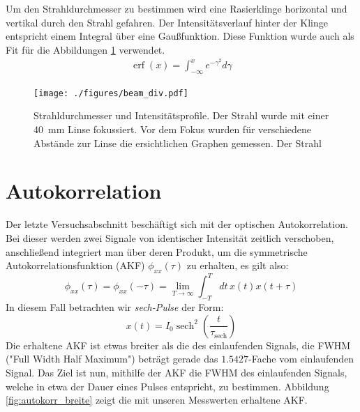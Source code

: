 \documentclass[11pt,twoside=semi]{scrartcl}
\begin{document}
Um den Strahldurchmesser zu bestimmen wird eine Rasierklinge horizontal und
vertikal durch den Strahl gefahren. Der Intensitätsverlauf hinter der Klinge
entspricht einem Integral über eine Gaußfunktion. Diese Funktion wurde auch
als Fit für die Abbildungen \ref{fig:beam_div} verwendet.
%
\begin{align*}
  \operatorname{erf}(x) = \int_{-\infty}^{x} e^{-\gamma^2} d\gamma
\end{align*}
%


\begin{figure}[H]
  \centering
  \texttt{[image: ./figures/beam\_div.pdf]}
  \caption{Strahldurchmesser und Intensitätsprofile. Der Strahl wurde mit einer
  \SI{40}{\milli\metre} Linse fokussiert. Vor dem Fokus wurden für verschiedene 
  Abstände zur Linse die ersichtlichen Graphen gemessen. Der Strahl}
  \label{fig:beam_div}
\end{figure}




\newpage



\section{Autokorrelation}
Der letzte Versuchsabschnitt beschäftigt sich mit der optischen Autokorrelation. Bei dieser
werden zwei Signale von identischer Intensität zeitlich verschoben, anschließend integriert
man über deren Produkt, um die symmetrische Autokorrelationsfunktion (AKF) $\phi_{xx}(\tau)$ zu 
erhalten, es gilt also:
\begin{equation}
\phi_{xx}(\tau) = \phi_{xx}(-\tau) = \lim\limits_{T \rightarrow \infty}{\int_{-T}^{T} dt\, x(t)x(t+\tau)}
\end{equation}
In diesem Fall betrachten wir \emph{sech-Pulse} der Form:
\begin{equation}
x(t) = I_{0}\operatorname{sech}^{2}\left(\frac{t}{\tau_{\text{sech}}}\right)
\end{equation}
Die erhaltene AKF ist etwas breiter als die des einlaufenden Signals,
die FWHM ("Full Width Half Maximum") beträgt gerade das $1.5427$-Fache vom einlaufenden Signal.
Das Ziel ist nun, mithilfe der AKF die FWHM des einlaufenden Signals, welche
in etwa der Dauer eines Pulses entspricht, zu bestimmen. Abbildung \ref{fig:autokorr_breite}
zeigt die mit unseren Messwerten erhaltene AKF.
\end{document}
